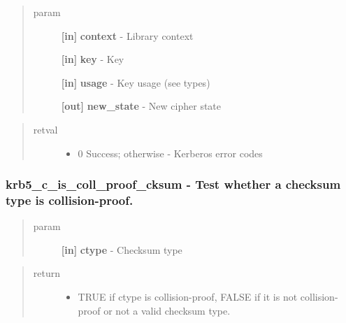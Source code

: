 \documentclass[letterpaper,10pt,english]{sphinxmanual}
\begin{document}
\begin{quote}\begin{description}
\item[{param}] \leavevmode
\textbf{{[}in{]}} \textbf{context} - Library context

\textbf{{[}in{]}} \textbf{key} - Key

\textbf{{[}in{]}} \textbf{usage} - Key usage (see  types)

\textbf{{[}out{]}} \textbf{new\_state} - New cipher state

\end{description}\end{quote}
\begin{quote}\begin{description}
\item[{retval}] \leavevmode\begin{itemize}
\item {} 
0   Success; otherwise - Kerberos error codes

\end{itemize}

\end{description}\end{quote}


\subsubsection{krb5\_c\_is\_coll\_proof\_cksum -  Test whether a checksum type is collision-proof.}
\label{appdev/refs/api/krb5_c_is_coll_proof_cksum:krb5-c-is-coll-proof-cksum-test-whether-a-checksum-type-is-collision-proof}\label{appdev/refs/api/krb5_c_is_coll_proof_cksum::doc}

\begin{fulllineitems}
\label{appdev/refs/api/krb5_c_is_coll_proof_cksum:c.krb5_c_is_coll_proof_cksum}
\end{fulllineitems}

\begin{quote}\begin{description}
\item[{param}] \leavevmode
\textbf{{[}in{]}} \textbf{ctype} - Checksum type

\end{description}\end{quote}
\begin{quote}\begin{description}
\item[{return}] \leavevmode\begin{itemize}
\item {} 
TRUE if ctype is collision-proof, FALSE if it is not collision-proof or not a valid checksum type.

\end{itemize}

\end{description}\end{quote}
\end{document}
